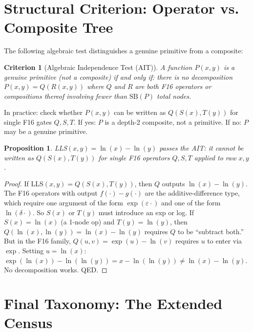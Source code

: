 \documentclass[11pt]{article}
\newtheorem{proposition}[theorem]{Proposition}
\newtheorem{criterion}[theorem]{Criterion}
\begin{document}
\section{Structural Criterion: Operator vs. Composite Tree}
\label{sec:structural}

The following algebraic test distinguishes a genuine primitive from a composite:

\begin{criterion}[Algebraic Independence Test (AIT)]
A function $P(x,y)$ is a genuine primitive (not a composite) if and only if:
there is no decomposition $P(x,y) = Q(R(x,y))$ where $Q$ and $R$ are
both F16 operators or compositions thereof involving fewer than
$\mathrm{SB}(P)$ total nodes.
\end{criterion}

\noindent In practice: check whether $P(x,y)$ can be written as $Q(S(x), T(y))$
for single F16 gates $Q, S, T$. If yes: $P$ is a depth-2 composite, not a primitive.
If no: $P$ may be a genuine primitive.

\begin{proposition}
LLS$(x,y) = \ln(x) - \ln(y)$ passes the AIT: it cannot be written as
$Q(S(x), T(y))$ for single F16 operators $Q, S, T$ applied to raw $x,y$.
\end{proposition}

\begin{proof}
If LLS$(x,y) = Q(S(x), T(y))$, then $Q$ outputs $\ln(x)-\ln(y)$.
The F16 operators with output $f(\cdot) - g(\cdot)$ are the additive-difference
type, which require one argument of the form $\exp(\varepsilon \cdot)$ and
one of the form $\ln(\delta \cdot)$. So $S(x)$ or $T(y)$ must introduce an
exp or log. If $S(x) = \ln(x)$ (a 1-node op) and $T(y) = \ln(y)$,
then $Q(\ln(x), \ln(y)) = \ln(x) - \ln(y)$ requires $Q$ to be ``subtract both.''
But in the F16 family, $Q(u,v) = \exp(u) - \ln(v)$ requires $u$ to enter via $\exp$.
Setting $u = \ln(x)$: $\exp(\ln(x)) - \ln(\ln(y)) = x - \ln(\ln(y)) \neq \ln(x)-\ln(y)$.
No decomposition works. QED.
\end{proof}

\section{Final Taxonomy: The Extended Census}
\label{sec:taxonomy}
\end{document}
